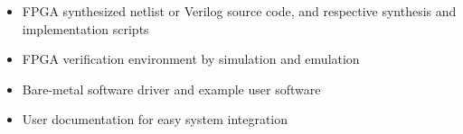 %

\begin{itemize}
  \itemsep-0.5em
\item FPGA synthesized netlist or Verilog source code, and respective
  synthesis and implementation scripts
\item FPGA verification environment by simulation and emulation
\item Bare-metal software driver and example user software
\item User documentation for easy system integration
\end{itemize}
